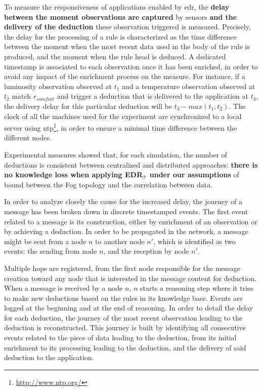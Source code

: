 \documentclass{iosart2c}
\newcommand{\edrt}{EDR$_{\mathcal{T}}$\xspace}
\begin{document}
To measure the responsiveness of applications enabled by \gls{edr}, the \textbf{delay between the moment observations are captured} by sensors \textbf{and the delivery of the deduction} these observation triggered is measured.
Precisely, the delay for the processing of a rule is characterized as the time difference between the moment when the most recent data used in the body of the rule is produced, and the moment when the rule head is deduced.
A dedicated timestamp is associated to each observation once it has been enriched, in order to avoid any impact of the enrichment process on the measure.
For instance, if a luminosity observation observed at $t_{1}$ and a temperature observation observed at $t_{2}$ match $r_{comfort}$ and trigger a deduction that is delivered to the application at $t_{3}$, the delivery delay for this particular deduction will be $t_3 - max(t_1, t_2)$.
The clock of all the machines used for the experiment are synchronized to a local server using \gls{ntp}\footnote{\url{http://www.ntp.org/}}, in order to ensure a minimal time difference between the different nodes.

Experimental measures showed that, for each simulation, the number of deductions is consistent between centralized and distributed approaches: \textbf{there is no knowledge loss when applying \edrt under our assumptions} of bound between the Fog topology and the correlation between data.

In order to analyze closely the cause for the increased delay, the journey of a message has been broken down in discrete timestamped events. 
The first event related to a message is its construction, either by enrichment of an observation or by achieving a deduction.
In order to be propagated in the network, a message might be sent from a node $n$ to another node $n'$, which is identified as two events: the sending from node $n$, and the reception by node $n'$.

Multiple hops are registered, from the first node responsible for the message creation toward any node that is interested in the message content for deduction.
When a message is received by a node $n$, $n$ starts a reasoning step where it tries to make new deductions based on the rules in its knowledge base. 
Events are logged at the beginning and at the end of reasoning.
In order to detail the delay for each deduction, the journey of the most recent observation leading to the deduction is reconstructed.
This journey is built by identifying all consecutive events related to the piece of data leading to the deduction, from its initial enrichment to its processing leading to the deduction, and the delivery of said deduction to the application.
\end{document}
